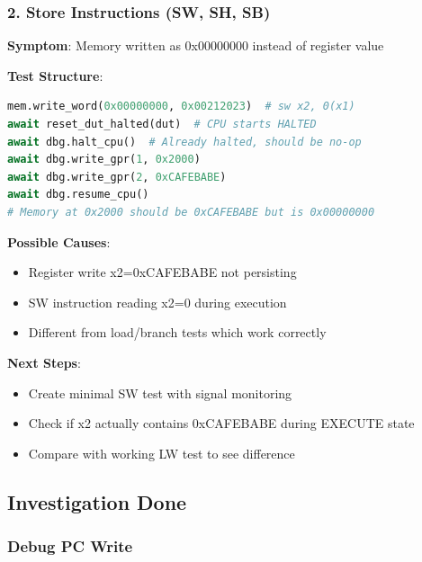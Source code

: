 \subsubsection{2. Store Instructions (SW, SH, SB)}\label{cr:fix:test-fix-summary:2-store-instructions-sw-sh-sb}

\begin{record}

\textbf{Symptom}: Memory written as 0x00000000 instead of register value

\textbf{Test Structure}:

\begin{lstlisting}[language=Python]
mem.write_word(0x00000000, 0x00212023)  # sw x2, 0(x1)
await reset_dut_halted(dut)  # CPU starts HALTED
await dbg.halt_cpu()  # Already halted, should be no-op
await dbg.write_gpr(1, 0x2000)
await dbg.write_gpr(2, 0xCAFEBABE)
await dbg.resume_cpu()
# Memory at 0x2000 should be 0xCAFEBABE but is 0x00000000
\end{lstlisting}

\textbf{Possible Causes}:

\begin{itemize}
\tightlist
\item
  Register write x2=0xCAFEBABE not persisting
\item
  SW instruction reading x2=0 during execution
\item
  Different from load/\allowbreak{}branch tests which work correctly
\end{itemize}

\textbf{Next Steps}:

\begin{itemize}
\tightlist
\item
  Create minimal SW test with signal monitoring
\item
  Check if x2 actually contains 0xCAFEBABE during EXECUTE state
\item
  Compare with working LW test to see difference
\end{itemize}

\end{record}

\subsection{Investigation Done}\label{cr:fix:test-fix-summary:investigation-done}

\subsubsection{Debug PC Write}\label{cr:fix:test-fix-summary:debug-pc-write}

